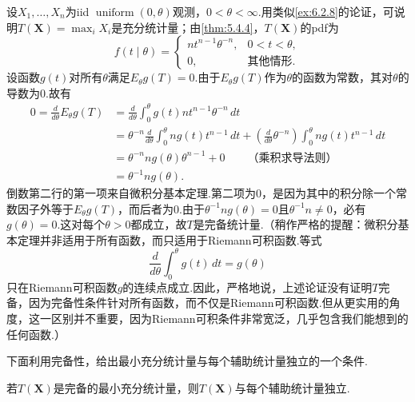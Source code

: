 \begin{example}[均匀分布的完备充分统计量]\label{ex:6.2.23}
设$X_1,\ldots,X_n$为iid $\operatorname{uniform}(0,\theta)$观测，$0<\theta<\infty$.用类似\autoref{ex:6.2.8}的论证，可说明$T(\boldsymbol X)=\max_iX_i$是充分统计量；由\autoref{thm:5.4.4}，$T(\boldsymbol X)$的pdf为
$$f(t\mid\theta)=\begin{cases}nt^{n-1}\theta^{-n},&0<t<\theta,\\0,&\text{其他情形}.\end{cases}$$
设函数$g(t)$对所有$\theta$满足$E_\theta g(T)=0$.由于$E_\theta g(T)$作为$\theta$的函数为常数，其对$\theta$的导数为0.故有
\begin{align*}
0=\frac d{d\theta}E_\theta g(T)&=\frac d{d\theta}\int_0^\theta g(t)nt^{n-1}\theta^{-n}\,dt\\
&=\theta^{-n}\frac d{d\theta}\int_0^\theta ng(t)t^{n-1}\,dt+\left(\frac d{d\theta}\theta^{-n}\right)\int_0^\theta ng(t)t^{n-1}\,dt\\
&=\theta^{-n}ng(\theta)\theta^{n-1}+0\qquad\text{（乘积求导法则）}\\
&=\theta^{-1}ng(\theta).
\end{align*}
倒数第二行的第一项来自微积分基本定理.第二项为0，是因为其中的积分除一个常数因子外等于$E_\theta g(T)$，而后者为0.由于$\theta^{-1}ng(\theta)=0$且$\theta^{-1}n\ne0$，必有$g(\theta)=0$.这对每个$\theta>0$都成立，故$T$是完备统计量.（稍作严格的提醒：微积分基本定理并非适用于所有函数，而只适用于Riemann可积函数.等式
$$\frac d{d\theta}\int_0^\theta g(t)\,dt=g(\theta)$$
只在Riemann可积函数$g$的连续点成立.因此，严格地说，上述论证没有证明$T$完备，因为完备性条件针对所有函数，而不仅是Riemann可积函数.但从更实用的角度，这一区别并不重要，因为Riemann可积条件非常宽泛，几乎包含我们能想到的任何函数.）
\end{example}
下面利用完备性，给出最小充分统计量与每个辅助统计量独立的一个条件.
\begin{theorem}[Basu定理]\label{thm:6.2.24}
若$T(\boldsymbol X)$是完备的最小充分统计量，则$T(\boldsymbol X)$与每个辅助统计量独立.
\end{theorem}
